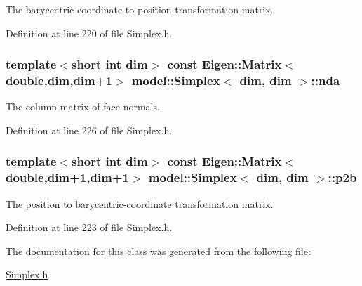 The barycentric-\/coordinate to position transformation matrix. 



Definition at line 220 of file Simplex.\+h.

\hypertarget{classmodel_1_1_simplex_3_01dim_00_01dim_01_4_abffa018e3a93369d19afa43217aa8cba}{}
\subsubsection[{nda}]{\setlength{\rightskip}{0pt plus 5cm}template$<$short int dim$>$ const Eigen\+::\+Matrix$<$double,{\bf dim},{\bf dim}+1$>$ {\bf model\+::\+Simplex}$<$ {\bf dim}, {\bf dim} $>$\+::nda}\label{classmodel_1_1_simplex_3_01dim_00_01dim_01_4_abffa018e3a93369d19afa43217aa8cba}


The column matrix of face normals. 



Definition at line 226 of file Simplex.\+h.

\hypertarget{classmodel_1_1_simplex_3_01dim_00_01dim_01_4_ad48b9fd57ece3ea832b3a354a62bfbf2}{}
\subsubsection[{p2b}]{\setlength{\rightskip}{0pt plus 5cm}template$<$short int dim$>$ const Eigen\+::\+Matrix$<$double,{\bf dim}+1,{\bf dim}+1$>$ {\bf model\+::\+Simplex}$<$ {\bf dim}, {\bf dim} $>$\+::p2b}\label{classmodel_1_1_simplex_3_01dim_00_01dim_01_4_ad48b9fd57ece3ea832b3a354a62bfbf2}


The position to barycentric-\/coordinate transformation matrix. 



Definition at line 223 of file Simplex.\+h.



The documentation for this class was generated from the following file\+:\begin{DoxyCompactItemize}
\item 
\hyperlink{_simplex_8h}{Simplex.\+h}\end{DoxyCompactItemize}

